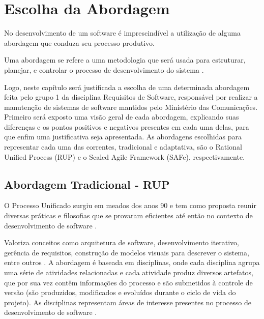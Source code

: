 \chapter[Escolha da Abordagem]{Escolha da Abordagem}
No desenvolvimento de um software é imprescindível a utilização de alguma abordagem que conduza seu processo produtivo.

Uma abordagem se refere a uma metodologia que será usada para estruturar, planejar, e controlar o processo de desenvolvimento do sistema \cite{CMS001}.

Logo, neste capítulo será justificada a escolha de uma determinada abordagem feita pelo grupo 1 da disciplina Requisitos de Software, responsável por realizar a manutenção de sistemas de software mantidos pelo Ministério das Comunicações. Primeiro será exposto uma visão geral de cada abordagem, explicando suas diferenças e os pontos positivos e negativos presentes em cada uma delas, para que enfim uma justificativa seja apresentada. As abordagens escolhidas para representar cada uma das correntes, tradicional e adaptativa, são o Rational Unified Process (RUP) e o Scaled Agile Framework (SAFe), respectivamente.

\section{Abordagem Tradicional - RUP}
O Processo Unificado surgiu em meados dos anos 90 e tem como proposta reunir diversas práticas e filosofias que se provaram eficientes até então no contexto de desenvolvimento de software \cite[p. 45]{kruchten001}.

Valoriza conceitos como arquitetura de software, desenvolvimento iterativo, gerência de requisitos, construção de modelos visuais para descrever o sistema, entre outros \cite[p. 45]{kruchten001}. A abordagem é baseada em disciplinas, onde cada disciplina agrupa uma série de atividades relacionadas e cada atividade produz diversos artefatos, que por sua vez contêm informações do processo e são submetidos à controle de versão (são produzidos, modificados e evoluídos durante o ciclo de vida do projeto). As disciplinas representam áreas de interesse presentes no processo de desenvolvimento de software \cite[p. 45]{kruchten001}.

